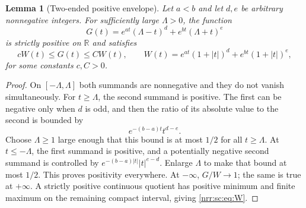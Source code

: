 \documentclass[11pt,letterpaper]{article}
\newtheorem{lemma}[theorem]{Lemma}
\theoremstyle{definition}
\theoremstyle{remark}
\newcommand{\R}{\mathbb R}
\begin{document}
\begin{lemma}[Two-ended positive envelope]
\label{nrr:sc:lem:envelope}
Let $a<b$ and let $d,e$ be arbitrary nonnegative integers.
For sufficiently large $\Lambda>0$, the function
\begin{equation}
 G(t)=e^{at}(\Lambda-t)^d+e^{bt}(\Lambda+t)^e
 \label{nrr:sc:eq:envelope}
\end{equation}
is strictly positive on $\R$ and satisfies
\begin{equation}
 cW(t)\le G(t)\le CW(t),\qquad
 W(t)=e^{at}(1+|t|)^d+e^{bt}(1+|t|)^e,
 \label{nrr:sc:eq:W}
\end{equation}
for some constants $c,C>0$.
\end{lemma}
\begin{proof}
On $[-\Lambda,\Lambda]$ both summands are nonnegative and they do not vanish
simultaneously. For $t\ge\Lambda$, the second summand is positive.
The first can be negative only when $d$ is odd, and then the ratio of
its absolute value to the second is bounded by
\[
 e^{-(b-a)t}t^{d-e}.
\]
Choose $\Lambda\ge1$ large enough that this bound is at most $1/2$ for all
$t\ge\Lambda$. At $t\le-\Lambda$, the first summand is positive, and a
potentially negative second summand is controlled by
$e^{-(b-a)|t|}|t|^{e-d}$. Enlarge $\Lambda$ to make that bound at most $1/2$.
This proves positivity everywhere.
At $-\infty$, $G/W\to1$; the same is true at $+\infty$.
A strictly positive continuous quotient has positive minimum and finite
maximum on the remaining compact interval, giving \eqref{nrr:sc:eq:W}.
\end{proof}
\end{document}
